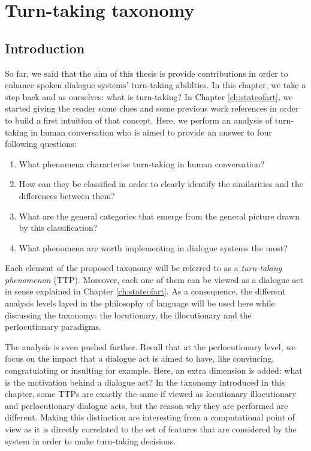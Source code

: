 \chapter{Turn-taking taxonomy}
\label{ch:taxonomy}


\section{Introduction}

        So far, we said that the aim of this thesis is provide contributions in order to enhance spoken dialogue systems' turn-taking abililties. In this chapter, we take a step back and as ourselves: what is turn-taking? In Chapter \ref{ch:stateofart}, we started giving the reader some clues and some previous work references in order to build a first intuition of that concept. Here, we perform an analysis of turn-taking in human conversation who is aimed to provide an answer to four following questions:

        \begin{enumerate}
          \item What phenomena characterise turn-taking in human conversation?
          \item How can they be classified in order to clearly identify the similarities and the differences between them?
          \item What are the general categories that emerge from the general picture drawn by this classification?
          \item What phenomena are worth implementing in dialogue systems the most?
        \end{enumerate}

        Each element of the proposed taxonomy will be referred to as a \textit{turn-taking phenomenon} (TTP). Moreover, each one of them can be viewed as a dialogue act in sense explained in Chapter \ref{ch:stateofart}. As a consequence, the different analysis levels layed in the philosophy of language will be used here while discussing the taxonomy: the locutionary, the illocutionary and the perlocutionary paradigms.

        The analysis is even pushed further. Recall that at the perlocutionary level, we focus on the impact that a dialogue act is aimed to have, like convincing, congratulating or insulting for example. Here, an extra dimension is added: what is the motivation behind a dialogue act? In the taxonomy introduced in this chapter, some TTPs are exactly the same if viewed as locutionary illocutionary and perlocutionary dialogue acts, but the reason why they are performed are different. Making this distinction are interesting from a computational point of view as it is directly correlated to the set of features that are considered by the system in order to make turn-taking decisions.

